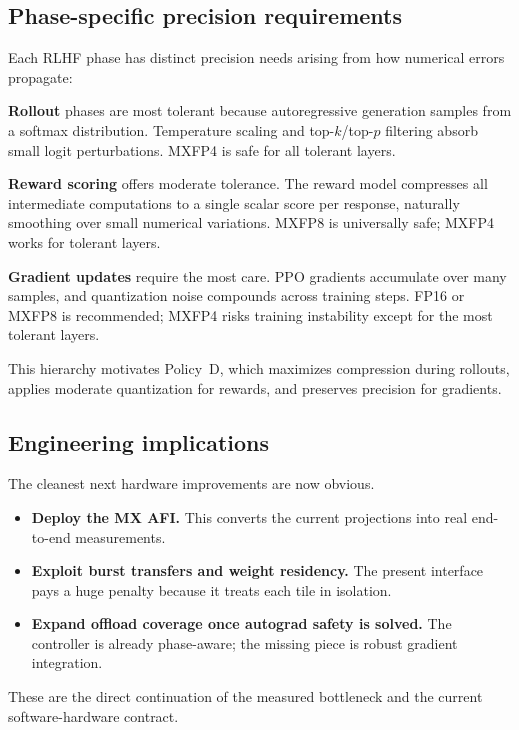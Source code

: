 \documentclass[11pt,a4paper]{article}
\begin{document}
\subsection{Phase-specific precision requirements}

Each RLHF phase has distinct precision needs arising from how numerical errors propagate:

\textbf{Rollout} phases are most tolerant because autoregressive generation samples from a softmax distribution.
Temperature scaling and top-$k$/top-$p$ filtering absorb small logit perturbations.
MXFP4 is safe for all tolerant layers.

\textbf{Reward scoring} offers moderate tolerance.
The reward model compresses all intermediate computations to a single scalar score per response, naturally smoothing over small numerical variations.
MXFP8 is universally safe; MXFP4 works for tolerant layers.

\textbf{Gradient updates} require the most care.
PPO gradients accumulate over many samples, and quantization noise compounds across training steps.
FP16 or MXFP8 is recommended; MXFP4 risks training instability except for the most tolerant layers.

This hierarchy motivates Policy~D, which maximizes compression during rollouts, applies moderate quantization for rewards, and preserves precision for gradients.

\subsection{Engineering implications}

The cleanest next hardware improvements are now obvious.

\begin{itemize}    \item \textbf{Deploy the MX AFI.} This converts the current projections into real end-to-end measurements.
    \item \textbf{Exploit burst transfers and weight residency.} The present interface pays a huge penalty because it treats each tile in isolation.
    \item \textbf{Expand offload coverage once autograd safety is solved.} The controller is already phase-aware; the missing piece is robust gradient integration.
\end{itemize}

These are the direct continuation of the measured bottleneck and the current software-hardware contract.
\end{document}
